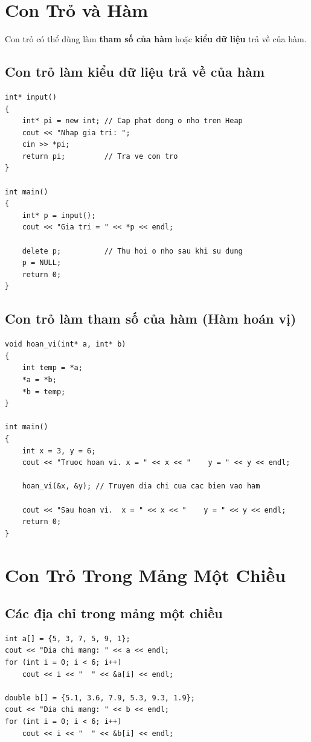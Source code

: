 \documentclass[12pt,a4paper]{article}
\begin{document}
\section{Con Trỏ và Hàm}
Con trỏ có thể dùng làm \textbf{tham số của hàm} hoặc \textbf{kiểu dữ liệu} trả về của hàm.

\subsection{Con trỏ làm kiểu dữ liệu trả về của hàm}
\begin{lstlisting}
int* input()
{
    int* pi = new int; // Cap phat dong o nho tren Heap
    cout << "Nhap gia tri: ";
    cin >> *pi;
    return pi;         // Tra ve con tro
}

int main()
{
    int* p = input();
    cout << "Gia tri = " << *p << endl;

    delete p;          // Thu hoi o nho sau khi su dung
    p = NULL;
    return 0;
}
\end{lstlisting}

\subsection{Con trỏ làm tham số của hàm (Hàm hoán vị)}
\begin{lstlisting}
void hoan_vi(int* a, int* b)
{
    int temp = *a;
    *a = *b;
    *b = temp;
}

int main()
{
    int x = 3, y = 6;
    cout << "Truoc hoan vi. x = " << x << "    y = " << y << endl;

    hoan_vi(&x, &y); // Truyen dia chi cua cac bien vao ham

    cout << "Sau hoan vi.  x = " << x << "    y = " << y << endl;
    return 0;
}
\end{lstlisting}

\section{Con Trỏ Trong Mảng Một Chiều}

\subsection{Các địa chỉ trong mảng một chiều}
\begin{lstlisting}
int a[] = {5, 3, 7, 5, 9, 1};
cout << "Dia chi mang: " << a << endl;
for (int i = 0; i < 6; i++)
    cout << i << "  " << &a[i] << endl;

double b[] = {5.1, 3.6, 7.9, 5.3, 9.3, 1.9};
cout << "Dia chi mang: " << b << endl;
for (int i = 0; i < 6; i++)
    cout << i << "  " << &b[i] << endl;
\end{lstlisting}
\end{document}
